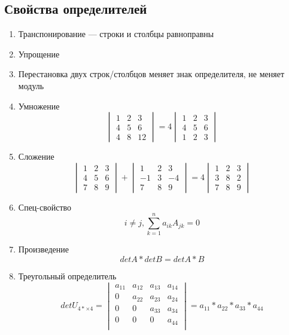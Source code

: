 \documentclass{article}
\begin{document}
\subsection{Свойства определителей}

\begin{enumerate}
	\item Транспонирование --- строки и столбцы равноправны
	\item Упрощение
	\item Перестановка двух строк/столбцов меняет знак определителя, не меняет модуль
	\item Умножение
	\[
	\begin{vmatrix}
		1 & 2 & 3 \\
		4 & 5 & 6 \\
		4 & 8 & 12
	\end{vmatrix} =
	4 \begin{vmatrix}
		1 & 2 & 3 \\
		4 & 5 & 6 \\
		1 & 2 & 3
	\end{vmatrix}
	\]
	\item Сложение
	\[
	\begin{vmatrix}
		1 & 2 & 3 \\
		4 & 5 & 6 \\
		7 & 8 & 9
	\end{vmatrix} +
	\begin{vmatrix}
		1 & 2 & 3 \\
		-1 & 3 & -4 \\
		7 & 8 & 9
	\end{vmatrix} =
	4 \begin{vmatrix}
		1 & 2 & 3 \\
		3 & 8 & 2 \\
		7 & 8 & 9
	\end{vmatrix}
	\]
	\item Спец-свойство
	\[
	i \ne j, \sum_{k=1}^{n} a_{ik} A_{jk} = 0
	\]
	\item Произведение
	\[
	det A * det B = det A * B
	\]
	\item Треугольный определитель
	\[
	det U_{4*\times 4} =
	\begin{vmatrix}
		a_{11} & a_{12} & a_{13} & a_{14} \\
		0 & a_{22} & a_{23} & a_{24} \\
		0 & 0 & a_{33} & a_{34} \\
		0 & 0 & 0 & a_{44} \\
	\end{vmatrix} =
	a_{11} * a_{22} * a_{33} * a_{44}
	\]
\end{enumerate}
\end{document}
